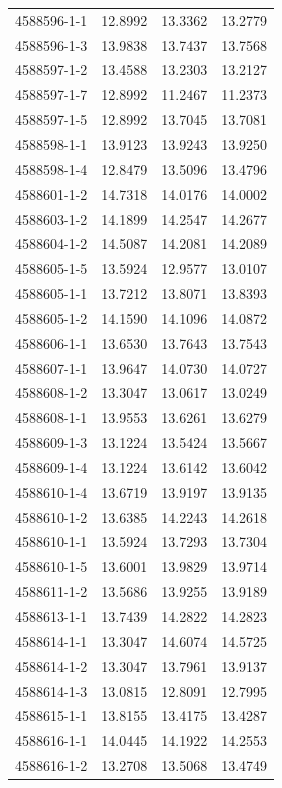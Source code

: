 \begin{longtable}{lrrr}
4588596-1-1 & 12.8992 & 13.3362 & 13.2779 \\
4588596-1-3 & 13.9838 & 13.7437 & 13.7568 \\
4588597-1-2 & 13.4588 & 13.2303 & 13.2127 \\
4588597-1-7 & 12.8992 & 11.2467 & 11.2373 \\
4588597-1-5 & 12.8992 & 13.7045 & 13.7081 \\
4588598-1-1 & 13.9123 & 13.9243 & 13.9250 \\
4588598-1-4 & 12.8479 & 13.5096 & 13.4796 \\
4588601-1-2 & 14.7318 & 14.0176 & 14.0002 \\
4588603-1-2 & 14.1899 & 14.2547 & 14.2677 \\
4588604-1-2 & 14.5087 & 14.2081 & 14.2089 \\
4588605-1-5 & 13.5924 & 12.9577 & 13.0107 \\
4588605-1-1 & 13.7212 & 13.8071 & 13.8393 \\
4588605-1-2 & 14.1590 & 14.1096 & 14.0872 \\
4588606-1-1 & 13.6530 & 13.7643 & 13.7543 \\
4588607-1-1 & 13.9647 & 14.0730 & 14.0727 \\
4588608-1-2 & 13.3047 & 13.0617 & 13.0249 \\
4588608-1-1 & 13.9553 & 13.6261 & 13.6279 \\
4588609-1-3 & 13.1224 & 13.5424 & 13.5667 \\
4588609-1-4 & 13.1224 & 13.6142 & 13.6042 \\
4588610-1-4 & 13.6719 & 13.9197 & 13.9135 \\
4588610-1-2 & 13.6385 & 14.2243 & 14.2618 \\
4588610-1-1 & 13.5924 & 13.7293 & 13.7304 \\
4588610-1-5 & 13.6001 & 13.9829 & 13.9714 \\
4588611-1-2 & 13.5686 & 13.9255 & 13.9189 \\
4588613-1-1 & 13.7439 & 14.2822 & 14.2823 \\
4588614-1-1 & 13.3047 & 14.6074 & 14.5725 \\
4588614-1-2 & 13.3047 & 13.7961 & 13.9137 \\
4588614-1-3 & 13.0815 & 12.8091 & 12.7995 \\
4588615-1-1 & 13.8155 & 13.4175 & 13.4287 \\
4588616-1-1 & 14.0445 & 14.1922 & 14.2553 \\
4588616-1-2 & 13.2708 & 13.5068 & 13.4749 \\

\end{longtable}
